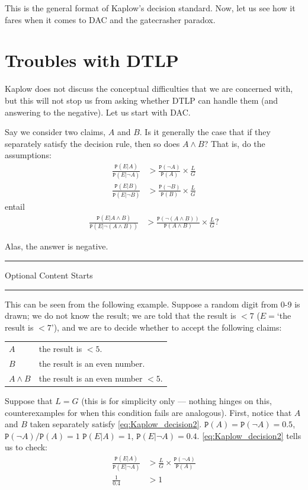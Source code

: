 \documentclass{ifcolog}
\newcommand{\intermezzoa}{
	\begin{minipage}[c]{13cm}
	\begin{center}\rule{10cm}{0.4pt}



	\tiny{\sc Optional Content Starts}
	
	\vspace{-1mm}
	
	\rule{10cm}{0.4pt}\end{center}
	\end{minipage}\nopagebreak 
	}
\newcommand{\pr}[1]{\mbox{$\mathtt{P}(#1)$}}
\newcommand{\n}{\neg}
\newcommand{\et}{\wedge}
\begin{document}
This is the general format of Kaplow's decision standard. Now, let us see how it fares when it comes to DAC and the gatecrasher paradox.





 \section{Troubles with  DTLP}\label{sec:troubles_DTLP}


 Kaplow does not discuss the conceptual difficulties that we are concerned with, but this will not stop us from asking whether DTLP can handle them (and answering to the negative). Let us start with DAC.
 
  Say we consider two claims, $A$ and $B$. Is it generally the case that if they separately satisfy the decision rule, then so does $A\et B$? That is, do the assumptions:
 \begin{align*}
 \frac{\pr{E\vert A}}{\pr{E\vert \n A}}  & > \frac{\pr{\n A}}{\pr{A}} \times \frac{L}{G}\\
 \frac{\pr{E\vert B}}{\pr{E\vert \n B}}  & > \frac{\pr{\n B}}{\pr{B}} \times \frac{L}{G}
 \end{align*}
 \noindent entail
 \begin{align*}
 \frac{\pr{E\vert A\et B}}{\pr{E\vert \n (A\et B)}}  & > \frac{\pr{\n (A\et B)}}{
 \pr{A\et B}} \times \frac{L}{G}?
 \end{align*}

Alas, the answer is negative.

\intermezzoa

This can be seen from the following example.  Suppose a random digit from 0-9 is drawn; we do not know the result; we are  told that the result is $<7$ ($E=$`the result is $<7$'), and  we are to decide whether to accept the following claims:
 \begin{center}
 \begin{tabular}{@{}ll@{}}
 \toprule
 $A$ & the result is $<5$. \\
 $B$  & the result is an even number.\\
 $A\et B$ & the result is an even number $<5$. \\
 \bottomrule
 \end{tabular}
 \end{center}
 Suppose that $L=G$ (this is for simplicity only --- nothing hinges on this, counterexamples for when this condition fails are analogous). First, notice that $A$ and $B$ taken separately satisfy \eqref{eq:Kaplow_decision2}. $\pr{A}=\pr{\n A}=0.5$, $\pr{\n A}/\pr{A}=1$ $\pr{E\vert A}=1$, $\pr{E\vert \n A}=0.4$. \eqref{eq:Kaplow_decision2} tells us to check:
 \begin{align*}
 \frac{\pr{E\vert A}}{\pr{E\vert \n A}}&> \frac{L}{G}\times \frac{\pr{\n A}}{\pr{A}}\\
 \frac{1}{0.4} & > 1
 \end{align*}
\end{document}

